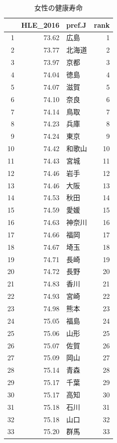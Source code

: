 \begin{table}[ht]
\centering
\footnotesize
\caption{女性の健康寿命}
\begin{tabular}{rrlr}
  \hline
 & HLE\_2016 & pref.J & rank \\
  \hline
1 & 73.62 & 広島 &   1 \\
  2 & 73.77 & 北海道 &   2 \\
  3 & 73.97 & 京都 &   3 \\
  4 & 74.04 & 徳島 &   4 \\
  5 & 74.07 & 滋賀 &   5 \\
  6 & 74.10 & 奈良 &   6 \\
  7 & 74.14 & 鳥取 &   7 \\
  8 & 74.23 & 兵庫 &   8 \\
  9 & 74.24 & 東京 &   9 \\
  10 & 74.42 & 和歌山 &  10 \\
  11 & 74.43 & 宮城 &  11 \\
  12 & 74.46 & 岩手 &  12 \\
  13 & 74.46 & 大阪 &  13 \\
  14 & 74.53 & 秋田 &  14 \\
  15 & 74.59 & 愛媛 &  15 \\
  16 & 74.63 & 神奈川 &  16 \\
  17 & 74.66 & 福岡 &  17 \\
  18 & 74.67 & 埼玉 &  18 \\
  19 & 74.71 & 長崎 &  19 \\
  20 & 74.72 & 長野 &  20 \\
  21 & 74.83 & 香川 &  21 \\
  22 & 74.93 & 宮崎 &  22 \\
  23 & 74.98 & 熊本 &  23 \\
  24 & 75.05 & 福島 &  24 \\
  25 & 75.06 & 山形 &  25 \\
  26 & 75.07 & 佐賀 &  26 \\
  27 & 75.09 & 岡山 &  27 \\
  28 & 75.14 & 青森 &  28 \\
  29 & 75.17 & 千葉 &  29 \\
  30 & 75.17 & 高知 &  30 \\
  31 & 75.18 & 石川 &  31 \\
  32 & 75.18 & 山口 &  32 \\
  33 & 75.20 & 群馬 &  33 \\

\end{tabular}
\end{table}
